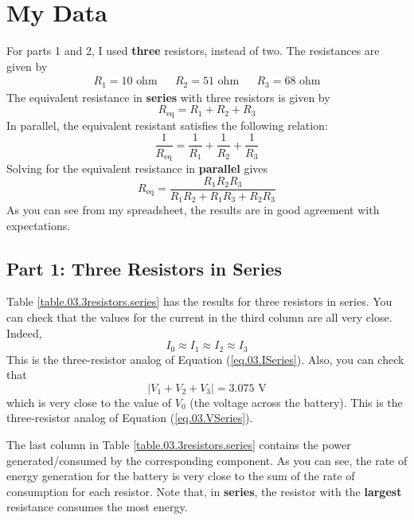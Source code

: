 \section{My Data}
%
For parts 1 and 2, I used \textbf{three} resistors, instead of two. The resistances are given by
\begin{align}
	R_{1} = 10 \text{ ohm} && R_{2} = 51 \text{ ohm} && R_{3} = 68 \text{ ohm}
\end{align}
The equivalent resistance in \textbf{series} with three resistors is given by
\begin{equation}
	R_{\text{eq}} = R_{1} + R_{2} + R_{3}
\end{equation}
In parallel, the equivalent resistant satisfies the following relation:
\begin{equation}
	\frac{1}{R_{\text{eq}}} = \frac{1}{R_{1}} + \frac{1}{R_{2}} + \frac{1}{R_{3}}
\end{equation}
Solving for the equivalent resistance in \textbf{parallel} gives
\begin{equation}
	R_{\text{eq}} = \frac{R_{1} R_{2} R_{3}}{R_{1} R_{2} + R_{1} R_{3} + R_{2} R_{3}}
\end{equation}
As you can see from my spreadsheet, the results are in good agreement with expectations.
%
\subsection{Part 1: Three Resistors in Series}
%
Table \ref{table.03.3resistors.series} has the results for three resistors in series. You can check that the values for the current in the third column are all very close. Indeed,
\begin{equation}
	I_{0} \approx I_{1} \approx I_{2} \approx I_{3}
\end{equation}
This is the three-resistor analog of Equation (\ref{eq.03.ISeries}). Also, you can check that
\begin{equation}
	| V_{1} + V_{2} + V_{3} | = 3.075 \text{ V}
\end{equation}
which is very close to the value of $V_{0}$ (the voltage across the battery). This is the three-resistor analog of Equation (\ref{eq.03.VSeries}).

The last column in Table \ref{table.03.3resistors.series} contains the power generated/consumed by the corresponding component. As you can see, the rate of energy generation for the battery is very close to the sum of the rate of consumption for each resistor. Note that, in \textbf{series}, the resistor with the \textbf{largest} resistance consumes the most energy.
%
